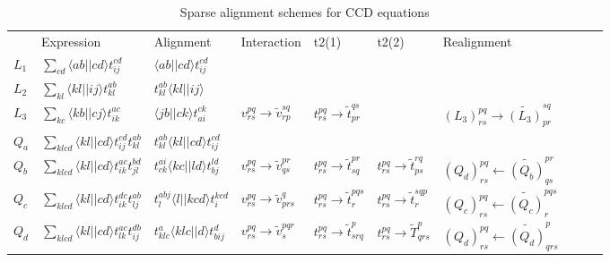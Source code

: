 \begin{table}[]
\centering
\caption{Sparse alignment schemes for CCD equations}
\label{tab:sparse_alignments_CCD}
\begin{tabular}{llllllllll}
  & Expression   &  Alignment  & Interaction   &  t2(1)   & t2(2) & Realignment \\ 
$L_1$   & $ \sum_{cd} \langle ab \vert \vert cd \rangle t^{cd}_{ij}$   & $\langle ab \vert \vert cd \rangle t^{cd}_{ij}$    \\
$L_2$   & $ \sum_{kl} \langle kl \vert \vert ij \rangle t^{ab}_{kl}$   & $t^{ab}_{kl} \langle kl \vert \vert ij \rangle $   \\
$L_3$   & $ \sum_{kc} \langle kb \vert \vert cj \rangle t^{ac}_{ik}$   & $\langle jb \vert \vert ck \rangle t^{ck}_{ai}$  & $v^{pq}_{rs} \rightarrow \tilde{v}^{sq}_{rp}$  &  $t^{pq}_{rs} \rightarrow \tilde{t}^{qs}_{pr}$  & & $(L_3)^{pq}_{rs} \rightarrow \tilde{(L_3)}^{sq}_{pr}$ \\
$Q_a$   &$ \sum_{klcd} \langle kl \vert \vert cd \rangle t^{cd}_{ij} t^{ab}_{kl}$   & $t^{ab}_{kl} \langle kl \vert \vert cd \rangle t^{cd}_{ij}$  &    \\
$Q_b$   &$ \sum_{klcd} \langle kl \vert \vert cd \rangle t^{ac}_{ik} t^{bd}_{jl}$   & $t^{ai}_{ck} \langle kc \vert \vert ld \rangle t^{ld}_{bj}$ & $v^{pq}_{rs} \rightarrow \tilde{v}^{pr}_{qs}$  & $t^{pq}_{rs} \rightarrow \tilde{t}^{pr}_{sq}$  &$t^{pq}_{rs} \rightarrow \tilde{t}^{rq}_{ps}$& $(Q_d)^{pq}_{rs} \leftarrow \tilde{(Q_b)}^{pr}_{qs}$ \\
$Q_c$   &$ \sum_{klcd} \langle kl \vert \vert cd \rangle t^{dc}_{ik} t^{ab}_{lj}$   & $ t^{abj}_{l} \langle l \vert \vert kcd \rangle t^{kcd}_{i}$  & $v^{pq}_{rs} \rightarrow \tilde{v}^{q}_{prs}$  & $t^{pq}_{rs} \rightarrow \tilde{t}^{pqs}_{r}$  &$t^{pq}_{rs} \rightarrow \tilde{t}^{sqp}_{r}$&$(Q_c)^{pq}_{rs} \leftarrow \tilde{(Q_c)}^{pqs}_{r}$ \\
$Q_d$   &$ \sum_{klcd}\langle kl \vert \vert cd \rangle t^{ac}_{lk} t^{db}_{ij}$   & $t^{a}_{klc} \langle klc \vert \vert d \rangle t^{d}_{bij}$  & $v^{pq}_{rs} \rightarrow \tilde{v}^{pqr}_{s}$ & $t^{pq}_{rs} \rightarrow \tilde{t}^{p}_{srq}$  & $t^{pq}_{rs} \rightarrow \tilde{T}^{p}_{qrs}$ &$(Q_d)^{pq}_{rs} \leftarrow \tilde{(Q_d)}^{p}_{qrs}$ \\
\end{tabular}
\end{table}

